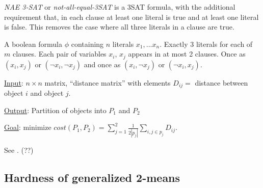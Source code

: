 \begin{definition} \emph{NAE 3-SAT} or
  \emph{not-all-equal-3SAT} is a 3SAT formula, with the additional
  requirement that, in each clause at least one literal is true and at
  least one literal is false.  This removes the case where all three
  literals in a clause are true.   
\end{definition}

\begin{definition} 
A boolean formula $\phi$ containing $n$ literals $x_1,...x_n$.
Exactly 3 literals for each of $m$ clauses.  Each pair of variables
$x_i$, $x_j$ appears in at most 2 clauses.  Once as $(x_i,x_j)$ or
$(\neg x_i, \neg x_j)$ and once as  $(x_i,\neg x_j)$ or $(\neg x_i,
x_j)$. 
\end{definition}

\begin{definition}
\item \underline{Input}:  $n \times n$ matrix, ``distance matrix''
  with elements $D_{ij} = $ distance between object $i$ and object
  $j$.
\item \underline{Output}:  Partition of objects into $P_1$ and $P_2$
\item \underline{Goal}: minimize $cost(P_1,P_2) = \sum_{j=1}^{2}
  \frac{1}{2|p_j|} \sum_{i,j \in p_j} D_{ij}$. 
\end{definition}


\begin{lemma} \label{np-nae-3-sat}
See \cite{das2008}. (??)
\end{lemma}

\subsection{Hardness of generalized 2-means}

